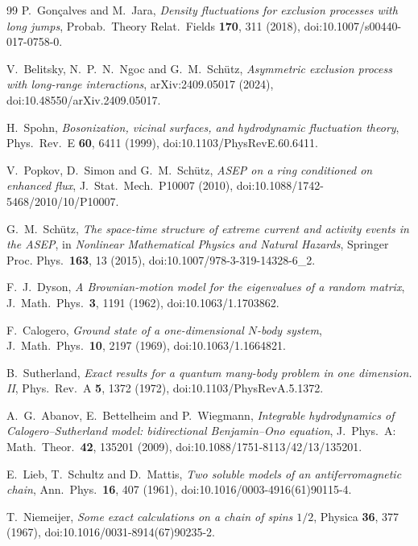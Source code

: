 \documentclass[11pt]{article}
\numberwithin{equation}{section}
\newcommand{\1}{\mathbf 1}
\begin{document}
\begin{thebibliography}{99}
P.~Gon\c{c}alves and M.~Jara,
\emph{Density fluctuations for exclusion processes with long jumps},
Probab.~Theory Relat.~Fields \textbf{170}, 311 (2018),
doi:10.1007/s00440-017-0758-0.

V.~Belitsky, N.~P.~N.~Ngoc and G.~M.~Sch\"utz,
\emph{Asymmetric exclusion process with long-range interactions},
arXiv:2409.05017 (2024),
doi:10.48550/arXiv.2409.05017.

H.~Spohn,
\emph{Bosonization, vicinal surfaces, and hydrodynamic fluctuation theory},
Phys.~Rev.~E \textbf{60}, 6411 (1999),
doi:10.1103/PhysRevE.60.6411.

V.~Popkov, D.~Simon and G.~M.~Sch\"utz,
\emph{ASEP on a ring conditioned on enhanced flux},
J.~Stat.~Mech.~P10007 (2010),
doi:10.1088/1742-5468/2010/10/P10007.

G.~M.~Sch\"utz,
\emph{The space-time structure of extreme current and activity events in the
ASEP},
in \emph{Nonlinear Mathematical Physics and Natural Hazards}, Springer Proc.
Phys.~\textbf{163}, 13 (2015),
doi:10.1007/978-3-319-14328-6\_2.

F.~J.~Dyson,
\emph{A Brownian-motion model for the eigenvalues of a random matrix},
J.~Math.~Phys.~\textbf{3}, 1191 (1962),
doi:10.1063/1.1703862.

F.~Calogero,
\emph{Ground state of a one-dimensional $N$-body system},
J.~Math.~Phys.~\textbf{10}, 2197 (1969),
doi:10.1063/1.1664821.

B.~Sutherland,
\emph{Exact results for a quantum many-body problem in one dimension. II},
Phys.~Rev.~A \textbf{5}, 1372 (1972),
doi:10.1103/PhysRevA.5.1372.

A.~G.~Abanov, E.~Bettelheim and P.~Wiegmann,
\emph{Integrable hydrodynamics of Calogero--Sutherland model: bidirectional
Benjamin--Ono equation},
J.~Phys.~A: Math.~Theor.~\textbf{42}, 135201 (2009),
doi:10.1088/1751-8113/42/13/135201.

E.~Lieb, T.~Schultz and D.~Mattis,
\emph{Two soluble models of an antiferromagnetic chain},
Ann.~Phys.~\textbf{16}, 407 (1961),
doi:10.1016/0003-4916(61)90115-4.

T.~Niemeijer,
\emph{Some exact calculations on a chain of spins $1/2$},
Physica \textbf{36}, 377 (1967),
doi:10.1016/0031-8914(67)90235-2.


\end{thebibliography}
\end{document}
